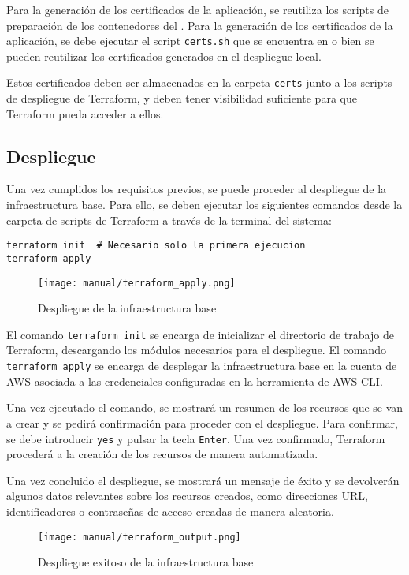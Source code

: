 Para la generación de los certificados de la aplicación, se reutiliza los
scripts de preparación de los contenedores del .
Para la generación de los certificados de la aplicación, se debe ejecutar
el script \texttt{certs.sh} que se encuentra en  o
bien se pueden reutilizar los certificados generados en el despliegue local.

Estos certificados deben ser almacenados en la carpeta \texttt{certs} junto a
los scripts de despliegue de Terraform, y deben tener visibilidad suficiente
para que Terraform pueda acceder a ellos.


\subsection{Despliegue}
Una vez cumplidos los requisitos previos, se puede proceder al despliegue de
la infraestructura base. Para ello, se deben ejecutar los siguientes comandos
desde la carpeta de scripts de Terraform a través de la terminal del sistema:

\begin{lstlisting}
terraform init  # Necesario solo la primera ejecucion
terraform apply
\end{lstlisting}

\begin{figure}[H]
	\centering
	\texttt{[image: manual/terraform\_apply.png]}
	\caption{Despliegue de la infraestructura base}
	\label{fig:terraform_apply}
\end{figure}

El comando \texttt{terraform init} se encarga de inicializar el directorio de
trabajo de Terraform, descargando los módulos necesarios para el despliegue.
El comando \texttt{terraform apply} se encarga de desplegar la infraestructura
base en la cuenta de AWS asociada a las credenciales configuradas en la
herramienta de AWS CLI.

Una vez ejecutado el comando, se mostrará un resumen de los recursos que se
van a crear y se pedirá confirmación para proceder con el despliegue. Para
confirmar, se debe introducir \texttt{yes} y pulsar la tecla \texttt{Enter}.
Una vez confirmado, Terraform procederá a la creación de los recursos de manera
automatizada.

Una vez concluido el despliegue, se mostrará un mensaje de éxito y se devolverán
algunos datos relevantes sobre los recursos creados, como direcciones URL,
identificadores o contraseñas de acceso creadas de manera aleatoria.

\begin{figure}[H]
	\centering
	\texttt{[image: manual/terraform\_output.png]}
	\caption{Despliegue exitoso de la infraestructura base}
	\label{fig:terraform_output}
\end{figure}
